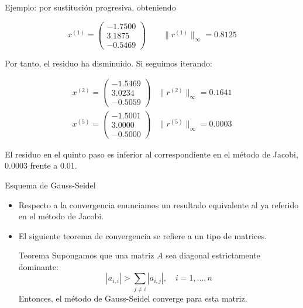 \documentclass[10pt]{beamer}
\begin{document}
  \begin{frame}{Ejemplo:}
    por sustituci\'on progresiva, obteniendo

    $$
    x^{(1)} = \left(\begin{array}{c}
          -1.7500 \\
           3.1875\\
           -0.5469
          \end{array}\right) \qquad \|r^{(1)}\|_{\infty} = 0.8125
    $$
        
    Por tanto, el residuo ha disminuido. Si seguimos iterando:
    
    \begin{eqnarray}
    \nonumber x^{(2)} = \left(\begin{array}{c}
          -1.5469 \\
           3.0234\\
           -0.5059
          \end{array}\right) & \|r^{(2)}\|_{\infty} = 0.1641\\
    \nonumber x^{(5)} = \left(\begin{array}{c}
          -1.5001 \\
           3.0000\\
           -0.5000
          \end{array}\right) & \|r^{(5)}\|_{\infty} = 0.0003
    \end{eqnarray}
    
    El residuo en el quinto paso es inferior al correspondiente en el m\'etodo de Jacobi, $0.0003$ frente a $0.01$.
  \end{frame}
  \begin{frame}{Esquema de Gauss-Seidel}
  \begin{itemize}
    \item<1-> Respecto a la convergencia enunciamos un resultado equivalente al ya referido en el m\'etodo de Jacobi.
    \item<2->El siguiente teorema de convergencia se refiere a un tipo de matrices.
    \begin{block}{Teorema}
      Supongamos que una matriz $A$ sea diagonal estrictamente dominante:
$$
|a_{i,i}| >\sum_{j \neq i}|a_{i,j}|,\quad i = 1,\ldots, n
$$
Entonces, el m\'etodo de Gauss-Seidel converge para esta matriz.
    \end{block}
  \end{itemize}
  \end{frame}
\end{document}
